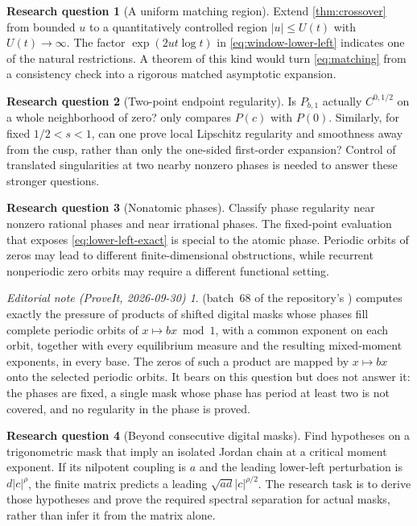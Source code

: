 \documentclass[11pt,a4paper]{article}
\numberwithin{equation}{section}
\theoremstyle{definition}
\newtheorem{question}{Research question}
\theoremstyle{remark}
\newtheorem*{ednotelater}{Editorial note (ProveIt, 2026-09-30)}
\begin{document}
\begin{question}[A uniform matching region]
Extend \cref{thm:crossover} from bounded $u$ to a quantitatively
controlled region $|u|\le U(t)$ with $U(t)\to\infty$.
The factor $\exp(2ut\log t)$ in
\cref{eq:window-lower-left} indicates one of the natural restrictions.
A theorem of this kind would turn \cref{eq:matching} from a consistency
check into a rigorous matched asymptotic expansion.
\end{question}

\begin{question}[Two-point endpoint regularity]
Is $P_{b,1}$ actually $C^{0,1/2}$ on a whole neighborhood of zero?
 only compares $P(c)$ with $P(0)$. Similarly, for fixed
$1/2<s<1$, can one prove local Lipschitz regularity and smoothness away
from the cusp, rather than only the one-sided first-order expansion?
Control of translated singularities at two nearby nonzero phases is
needed to answer these stronger questions.
\end{question}

\begin{question}[Nonatomic phases]
Classify phase regularity near nonzero rational phases and near
irrational phases. The fixed-point evaluation that exposes
\cref{eq:lower-left-exact} is special to the atomic phase. Periodic
orbits of zeros may lead to different finite-dimensional obstructions,
while recurrent nonperiodic zero orbits may require a different
functional setting.
\end{question}
\begin{ednotelater}
 (batch~68 of
the repository's ) computes exactly the pressure of
products of shifted digital masks whose phases fill complete periodic
orbits of $x\mapsto bx\bmod1$, with a common exponent on each orbit,
together with every equilibrium measure and the resulting mixed-moment
exponents, in every base. The zeros of such a product are mapped by $x\mapsto bx$ onto the selected periodic orbits. It bears on this question but does not
answer it: the phases are fixed, a single mask whose phase has period at
least two is not covered, and no regularity in the phase is proved.
\end{ednotelater}

\begin{question}[Beyond consecutive digital masks]
Find hypotheses on a trigonometric mask that imply an isolated Jordan
chain at a critical moment exponent. If its nilpotent coupling is $a$
and the leading lower-left perturbation is $d|c|^\rho$, the finite
matrix predicts a leading $\sqrt{ad}|c|^{\rho/2}$. The research task is
to derive those hypotheses and prove the required spectral separation
for actual masks, rather than infer it from the matrix alone.
\end{question}
\end{document}
